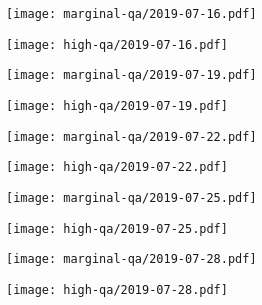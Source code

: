 \documentclass{article}
\begin{document}
\begin{figure}[H]
	\ContinuedFloat
	\centering
	\begin{subfigure}{0.48\linewidth}
		\texttt{[image: marginal-qa/2019-07-16.pdf]}
	\end{subfigure}
	\begin{subfigure}{0.48\linewidth}
		\texttt{[image: high-qa/2019-07-16.pdf]}
	\end{subfigure}
	\begin{subfigure}{0.48\linewidth}
		\texttt{[image: marginal-qa/2019-07-19.pdf]}
	\end{subfigure}
	\begin{subfigure}{0.48\linewidth}
		\texttt{[image: high-qa/2019-07-19.pdf]}
	\end{subfigure}
	\begin{subfigure}{0.48\linewidth}
		\texttt{[image: marginal-qa/2019-07-22.pdf]}
	\end{subfigure}
	\begin{subfigure}{0.48\linewidth}
		\texttt{[image: high-qa/2019-07-22.pdf]}
	\end{subfigure}
	\begin{subfigure}{0.48\linewidth}
		\texttt{[image: marginal-qa/2019-07-25.pdf]}
	\end{subfigure}
	\begin{subfigure}{0.48\linewidth}
		\texttt{[image: high-qa/2019-07-25.pdf]}
	\end{subfigure}
	\begin{subfigure}{0.48\linewidth}
		\texttt{[image: marginal-qa/2019-07-28.pdf]}
	\end{subfigure}
	\begin{subfigure}{0.48\linewidth}
		\texttt{[image: high-qa/2019-07-28.pdf]}
	\end{subfigure}
\end{figure}
\end{document}
